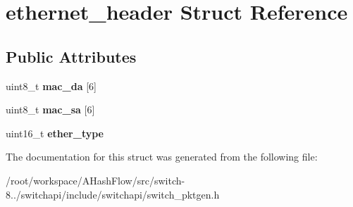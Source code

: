 \hypertarget{structethernet__header}{\section{ethernet\+\_\+header Struct Reference}
\label{structethernet__header}
}
\subsection*{Public Attributes}
\begin{DoxyCompactItemize}
\item 
\hypertarget{structethernet__header_a1e76b4eb6776db9b3aaa4d34f03bde6c}{uint8\+\_\+t {\bfseries mac\+\_\+da} \mbox{[}6\mbox{]}}\label{structethernet__header_a1e76b4eb6776db9b3aaa4d34f03bde6c}

\item 
\hypertarget{structethernet__header_ad0da2849c365843461335abd4ecebbde}{uint8\+\_\+t {\bfseries mac\+\_\+sa} \mbox{[}6\mbox{]}}\label{structethernet__header_ad0da2849c365843461335abd4ecebbde}

\item 
\hypertarget{structethernet__header_a8f427c70678f69b899f05f287a644540}{uint16\+\_\+t {\bfseries ether\+\_\+type}}\label{structethernet__header_a8f427c70678f69b899f05f287a644540}

\end{DoxyCompactItemize}


The documentation for this struct was generated from the following file\+:\begin{DoxyCompactItemize}
\item 
/root/workspace/\+A\+Hash\+Flow/src/switch-\/8../switchapi/include/switchapi/switch\+\_\+pktgen.\+h\end{DoxyCompactItemize}
